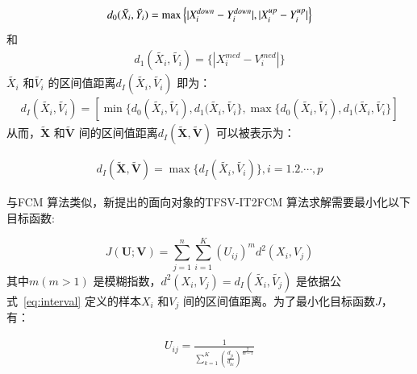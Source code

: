 \begin{equation}\label{eq:eq-3}
    \begin{split}
        d_0 (\tilde{X_i}, \tilde{Y_{i}}) = \max \Big \lbrace \lvert X_i^{down} - Y_i^{down}\rvert, \lvert X_i^{up} - Y_i^{up}\rvert \Big \rbrace
    \end{split}
\end{equation}
和
\begin{equation}\label{eq:eq-4}
    \begin{split}
        d_1 (\tilde{X_i}, \tilde{V_{i}}) = \Big\lbrace |X_i^{med} - V_i^{med}| \Big\rbrace
    \end{split}
\end{equation}
$\tilde{X_i}$ 和$\tilde{V_{i}}$ 的区间值距离$d_{I} (\tilde{X_i}, \tilde{V_i})$ 即为：
\begin{equation}\label{eq:eq-5}
    \begin{split}
        d_{I} (\tilde{X_i}, \tilde{V_i}) = [\min \lbrace d_0 (\tilde{X_i}, \tilde{V_{i}}) , d_1 (\tilde{X_i}, \tilde{V_{i}}  \rbrace,\max  \lbrace d_0 (\tilde{X_i}, \tilde{V_{i}}) , d_1 (\tilde{X_i}, \tilde{V_{i}}  \rbrace]
    \end{split}
\end{equation}
从而，$\bm{\tilde{X}}$ 和$\bm{\tilde{V}}$ 间的区间值距离$d_{I} (\bm{\tilde{X}}, \bm{\tilde{V}})$ 可以被表示为：

\begin{equation}\label{eq:eq-6}
    \begin{split}
        d_{I} (\bm{\tilde{X}}, \bm{\tilde{V}}) = \max \lbrace d_{I} (\tilde{X_i}, \tilde{V_i}) \rbrace, i =1.2.\cdots,p
    \end{split}
\end{equation}

与FCM 算法类似，新提出的面向对象的TFSV-IT2FCM 算法求解需要最小化以下目标函数:

\begin{equation}\label{eq:eq-7}
    J(\bm{U};\bm{V}) = \sum _{j=1} ^{n} \sum_{i=1} ^K (U_{ij})^m d^2(X_i,V_j)
\end{equation}
其中$m (m>1)$ 是模糊指数，$d^2(X_i,V_j) = d_{I} (\tilde{X_i}, \tilde{V_j})$ 是依据公式~\ref{eq:interval} 定义的样本$X_i$ 和$V_j$ 间的区间值距离。为了最小化目标函数$J$，有：

\begin{equation}\label{eq:12}
    \begin{split}
        U_{ij} = \frac{1}{\sum_{k=1}^K {(\frac{d_{ji}}{d_{ki}})}^{\frac{2}{m-1}}}
    \end{split}
\end{equation}

